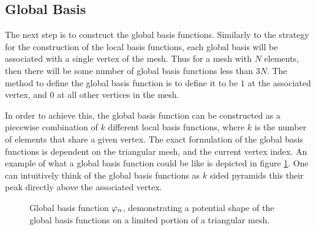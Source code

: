 \documentclass[../fem.tex]{subfile}
\begin{document}
\subsection{Global Basis}%
\label{sub:global_basis}

The next step is to construct the global basis functions. Similarly to the
strategy for the construction of the local basis functions, each global basis
will be associated with a single vertex of the mesh. Thus for a mesh with $N$
elements, then there will be some number of global basis functions less than
$3N$. The method to define the global basis function is to define it to be $1$
at the associated vertex, and $0$ at all other vertices in the mesh.

In order to achieve this, the global basis function can be constructed as a
piecewise combination of $k$ different local basis functions, where $k$ is the
number of elements that share a given vertex. The exact formulation of the
global basis functions is dependent on the triangular mesh, and the current
vertex index. An example of what a global basis function could be like is
depicted in figure \ref{fig:global_basis}. One can intuitively think of the
global basis functions as $k$ sided pyramids this their peak directly above the
associated vertex.

\begin{figure}[htpb]
\begin{center}
\end{center}
\caption{Global basis function $\varphi_n$, demonstrating a potential shape of the
global basis functions on a limited portion of a triangular mesh.}
\label{fig:global_basis}
\end{figure}
\end{document}
